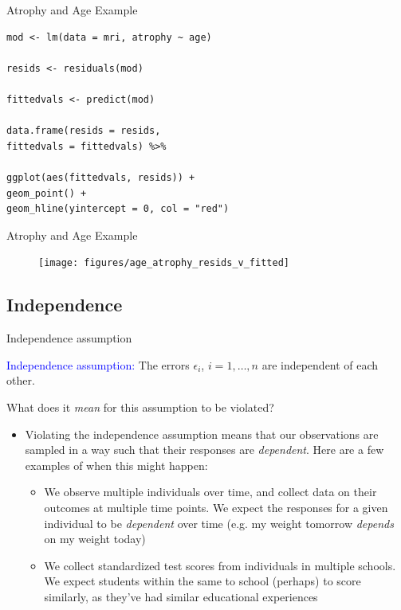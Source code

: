 \documentclass[10pt,t]{beamer}
\begin{document}
\begin{frame}[fragile]{Atrophy and Age Example}
	\begin{lstlisting}
mod <- lm(data = mri, atrophy ~ age)

resids <- residuals(mod)

fittedvals <- predict(mod)

data.frame(resids = resids,
fittedvals = fittedvals) %>%

ggplot(aes(fittedvals, resids)) +
geom_point() +
geom_hline(yintercept = 0, col = "red") 
\end{lstlisting}
\end{frame}

\begin{frame}{Atrophy and Age Example}
	\begin{figure}
		\centering
		\texttt{[image: figures/age\_atrophy\_resids\_v\_fitted]}
	\end{figure}
\medskip

\end{frame}


\subsection{Independence}

\begin{frame}{Independence assumption}
	
	\vspace{-5 mm}
\textcolor{blue}{Independence assumption:} The errors $\epsilon_i$, $i = 1, \dots, n$ are independent of each other.

\vspace{0.3cm}

What does it \textit{mean} for this assumption to be violated?

\vspace{0.3cm}

\begin{itemize}
	\item[] Violating the independence assumption means that our observations are sampled in a way such that their responses are \textit{dependent}. Here are a few examples of when this might happen:
	\begin{itemize}
		\item We observe multiple individuals over time, and collect data on their outcomes at multiple time points. We expect the responses for a given individual to be \textit{dependent} over time (e.g. my weight tomorrow \textit{depends} on my weight today)
		\medskip
		\item We collect standardized test scores from individuals in multiple schools. We expect students within the same to school (perhaps) to score similarly, as they've had similar educational experiences
	\end{itemize}
\end{itemize}
\end{frame}
\end{document}
